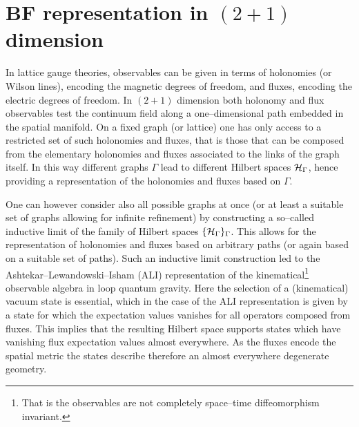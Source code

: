 \documentclass[nofootinbib,superscriptaddress,eqsecnum,tightenlines,11pt]{revtex4-1}
\begin{document}
\section{BF representation in $(2+1)$ dimension\label{sec_BF}}



In lattice gauge theories, observables can be given in terms of holonomies (or Wilson lines), encoding the magnetic degrees of freedom, and fluxes, encoding the electric degrees of freedom. In $(2+1)$ dimension both holonomy and flux observables test the continuum field along a one--dimensional path embedded in the spatial manifold. On a fixed graph (or lattice) one has only  access to a restricted set of such holonomies and fluxes, that is those that can be composed from the elementary holonomies and fluxes associated to the links of the graph itself. In this way different graphs $\Gamma$ lead to different Hilbert spaces ${\cal H}_\Gamma$, hence providing a representation of the holonomies and fluxes based on $\Gamma$.

One can however consider also all possible graphs at once (or at least a suitable set of graphs allowing for infinite refinement) by constructing a so--called inductive limit of the family of Hilbert spaces $\{{\cal H}_\Gamma\}_\Gamma$. This allows for the representation of holonomies and fluxes based on arbitrary paths (or again based on a  suitable set of paths).  Such an inductive limit construction led to the Ashtekar--Lewandowski--Isham (ALI) representation \cite{ALI} of the kinematical\footnote{That is the observables are not completely space--time diffeomorphism invariant.} observable algebra in loop quantum gravity. Here the selection of a  (kinematical) vacuum state is essential, which in the case of the ALI representation is given by a state for which the expectation values vanishes for all operators composed from fluxes. This implies that the resulting Hilbert space supports states which have vanishing flux expectation values almost everywhere. As the fluxes encode the spatial metric the states describe therefore an almost everywhere degenerate geometry.
\end{document}

